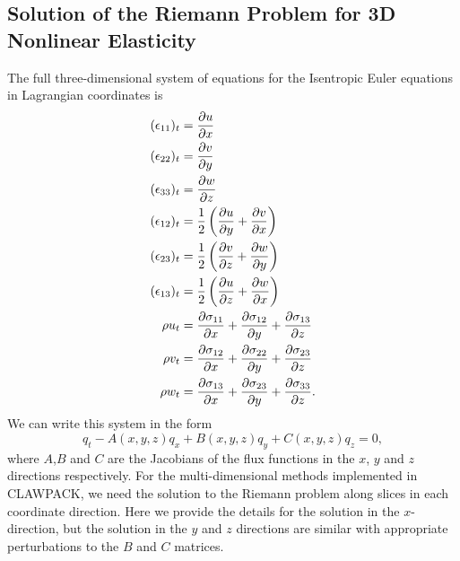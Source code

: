 \documentclass{article}
\begin{document}
\subsection{Solution of the Riemann Problem for 3D Nonlinear Elasticity}
\label{sec:3Delasticity}
The full three-dimensional system of equations for the Isentropic Euler equations in Lagrangian 
coordinates is 
\begin{align}
(\epsilon_{11})_t &= \frac{\partial u}{\partial x}\notag\\
(\epsilon_{22})_t &= \frac{\partial v}{\partial y}\notag\\
(\epsilon_{33})_t &= \frac{\partial w}{\partial z}\notag\\
(\epsilon_{12})_t &= \frac{1}{2}\left(\frac{\partial u}{\partial y} + \frac{\partial v}{\partial x}\right)\notag\\
(\epsilon_{23})_t &= \frac{1}{2}\left( \frac{\partial v}{\partial z} + \frac{\partial w}{\partial y}\right)\label{eqn:
3dlgeulsys}\\
(\epsilon_{13})_t &= \frac{1}{2}\left( \frac{\partial u}{\partial z} + \frac{\partial w}{\partial x}\right)\notag\\
\rho u_t &= \frac{\partial \sigma_{11}}{\partial x} +\frac{\partial \sigma_{12}}{\partial y} +  \frac{\partial 
\sigma_{13}}{\partial z}\notag\\
\rho v_t &=   \frac{\partial \sigma_{12}}{\partial x} +\frac{\partial \sigma_{22}}{\partial y} + \frac{\partial 
\sigma_{23}}{\partial z}\notag \\
\rho w_t &=  \frac{\partial \sigma_{13}}{\partial x} + \frac{\partial \sigma_{23}}{\partial y} + \frac{\partial 
\sigma_{33}}{\partial z}.\notag
\end{align}
We can write this system in the form 
\begin{equation}
	q_t - A(x,y,z) q_x + B(x,y,z) q_y + C(x,y,z) q_z = 0, 
\end{equation}
where $A$,$B$ and $C$ are the Jacobians of the flux functions in the $x$, $y$ and $z$ directions 
respectively.  For the multi-dimensional methods implemented in CLAWPACK, we need the solution to 
the Riemann problem along slices in each coordinate direction.  Here we provide the details for the 
solution in the $x$-direction, but the solution in the $y$ and $z$ directions are similar with appropriate 
perturbations to the $B$ and $C$ matrices. 
\end{document}
